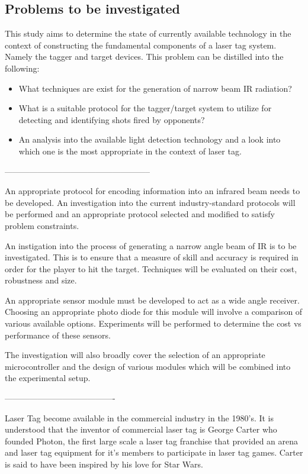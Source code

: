 \subsection{Problems to be investigated}

This study aims to determine the state of currently available technology in the context of constructing the fundamental components of a laser tag system. Namely the tagger and target devices. This problem can be distilled into the following:

\begin{itemize}
	\item What techniques are exist for the generation of narrow beam IR radiation?
	\item What is a suitable protocol for the tagger/target system to utilize for detecting and identifying shots fired by opponents?
	\item An analysis into the available light detection technology and a look into which one is the most appropriate in the context of laser tag.
\end{itemize}

-----------------------------------------------------

An appropriate protocol for encoding information into an infrared beam needs to be developed. An investigation into the current industry-standard protocols will be performed and an appropriate protocol selected and modified to satisfy problem constraints.

An instigation into the process of generating a narrow angle beam of IR is to be investigated. This is to ensure that a measure of skill and accuracy is required in order for the player to hit the target. Techniques will be evaluated on their cost, robustness and size.

An appropriate sensor module must be developed to act as a wide angle receiver. Choosing an appropriate photo diode for this module will involve a comparison of various available options. Experiments will be performed to determine the cost vs performance of these sensors.

The investigation will also broadly cover the selection of an appropriate microcontroller and the design of various modules which will be combined into the experimental setup.

----------------------------------------

Laser Tag become available in the commercial industry in the 1980's. It is understood that the inventor of commercial laser tag is George Carter who founded Photon, the first large scale a laser tag franchise that provided an arena and laser tag equipment for it's members to participate in laser tag games. Carter is said to have been inspired by his love for Star Wars.

